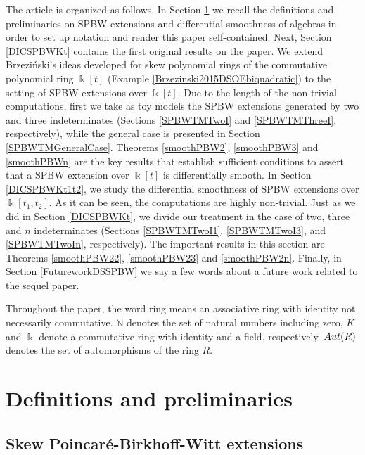 \documentclass{amsart}
\theoremstyle{definition}
\theoremstyle{remark}
\numberwithin{equation}{section}
\begin{document}
The article is organized as follows. In Section \ref{sec2} we recall the definitions and preliminaries on SPBW extensions and differential smoothness of algebras in order to set up notation and render this paper self-contained. Next, Section \ref{DICSPBWKt} contains the first original results on the paper. We extend Brzezi{\'n}ski's ideas developed for skew polynomial rings of the commutative polynomial ring $\Bbbk[t]$ \cite{Brzezinski2015} (Example \ref{Brzezinski2015DSOEbiquadratic}) to the setting of SPBW extensions over $\Bbbk[t]$. Due to the length of the non-trivial computations, first we take as toy models the SPBW extensions generated by two and three indeterminates (Sections \ref{SPBWTMTwoI} and \ref{SPBWTMThreeI}, respectively), while the general case is presented in Section \ref{SPBWTMGeneralCase}. Theorems \ref{smoothPBW2}, \ref{smoothPBW3} and \ref{smoothPBWn} are the key results that establish sufficient conditions to assert that a SPBW extension over $\Bbbk[t]$ is differentially smooth. In Section \ref{DICSPBWKt1t2}, we study the differential smoothness of SPBW extensions over $\Bbbk[t_1, t_2]$. As it can be seen, the computations are highly non-trivial. Just as we did in Section \ref{DICSPBWKt}, we divide our treatment in the case of two, three and $n$ indeterminates (Sections \ref{SPBWTMTwoI1}, \ref{SPBWTMTwoI3}, and \ref{SPBWTMTwoIn}, respectively). The important results in this section are Theorems \ref{smoothPBW22}, \ref{smoothPBW23} and \ref{smoothPBW2n}. Finally, in Section \ref{FutureworkDSSPBW} we say a few words about a future work related to the sequel paper.

Throughout the paper, the word ring means an associative ring with identity not necessarily commutative. $\mathbb{N}$ denotes the set of natural numbers including zero, $K$ and $\Bbbk$ denote a commutative ring with identity and a field, respectively. ${\rm Aut}(R)$ denotes the set of automorphisms of the ring $R$.


\section{Definitions and preliminaries}\label{sec2}

\subsection{Skew Poincar\'e-Birkhoff-Witt extensions}\label{SPBWdefinitionspreliminaries}
\end{document}
